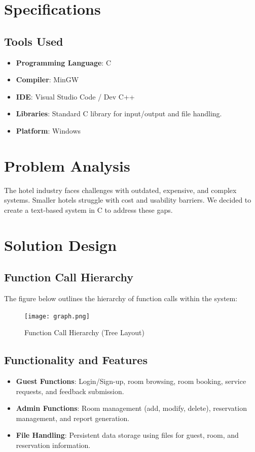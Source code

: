 \documentclass[12pt,a4paper]{article}
\begin{document}
\section{Specifications}
\subsection{Tools Used}
\begin{itemize}
    \item \textbf{Programming Language}: C
    \item \textbf{Compiler}: MinGW
    \item \textbf{IDE}: Visual Studio Code / Dev C++
    \item \textbf{Libraries}: Standard C library for input/output and file handling.
    \item \textbf{Platform}: Windows
\end{itemize}

\section{Problem Analysis}
The hotel industry faces challenges with outdated, expensive, and complex systems. Smaller hotels struggle with cost and usability barriers. We decided to create a text-based system in C to address these gaps.

\section{Solution Design}
\subsection{Function Call Hierarchy}
The figure below outlines the hierarchy of function calls within the system:
\begin{figure}[H]
    \centering
    \texttt{[image: graph.png]} %
    \caption{Function Call Hierarchy (Tree Layout)}
    \label{fig:hierarchy}
\end{figure}

\subsection{Functionality and Features}
\begin{itemize}
    \item \textbf{Guest Functions}: Login/Sign-up, room browsing, room booking, service requests, and feedback submission.
    \item \textbf{Admin Functions}: Room management (add, modify, delete), reservation management, and report generation.
    \item \textbf{File Handling}: Persistent data storage using files for guest, room, and reservation information.
\end{itemize}
\end{document}
